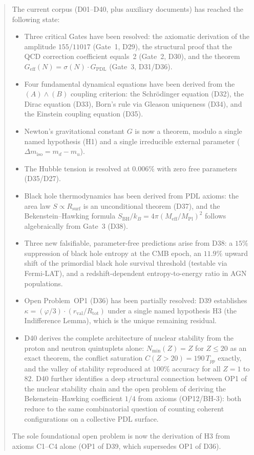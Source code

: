 \documentclass[11pt,a4paper]{article}
\theoremstyle{plain}
\theoremstyle{definition}
\theoremstyle{remark}
\newcommand{\Geff}{G_{\mathrm{eff}}}
\newcommand{\GPDL}{G_{\mathrm{PDL}}}
\newcommand{\rval}{r_{\mathrm{val}}}
\newcommand{\Rsurf}{R_{\mathrm{surf}}}
\newcommand{\Rtot}{R_{\mathrm{tot}}}
\newcommand{\sigmaN}{\sigma(N)}
\newcommand{\SBH}{S_{\mathrm{BH}}}
\newcommand{\Meff}{M_{\mathrm{eff}}}
\newcommand{\MPl}{M_{\mathrm{Pl}}}
\newcommand{\Tpp}{T_{pp}}
\newcommand{\Nmin}{N_{\min}}
\begin{document}
\begin{abstract}
The current corpus (D01--D40, plus auxiliary documents) has reached the following state:
\begin{itemize}
\item Three critical Gates have been resolved: the axiomatic derivation of the amplitude $155/11017$ (Gate~1, D29), the structural proof that the QCD correction coefficient equals~2 (Gate~2, D30), and the theorem $\Geff(N)=\sigmaN\cdot\GPDL$ (Gate~3, D31/D36).
\item Four fundamental dynamical equations have been derived from the $(A)\wedge(B)$ coupling criterion: the Schr\"odinger equation (D32), the Dirac equation (D33), Born's rule via Gleason uniqueness (D34), and the Einstein coupling equation (D35).
\item Newton's gravitational constant $G$ is now a theorem, modulo a single named hypothesis (H1) and a single irreducible external parameter ($\Delta m_{\mathrm{iso}} = m_d - m_u$).
\item The Hubble tension is resolved at $0.006\%$ with zero free parameters (D35/D27).
\item Black hole thermodynamics has been derived from PDL axioms: the area law $S \propto \Rsurf$ is an unconditional theorem (D37), and the Bekenstein--Hawking formula $\SBH/k_B = 4\pi(\Meff/\MPl)^2$ follows algebraically from Gate~3 (D38).
\item Three new falsifiable, parameter-free predictions arise from D38: a $15\%$ suppression of black hole entropy at the CMB epoch, an $11.9\%$ upward shift of the primordial black hole survival threshold (testable via Fermi-LAT), and a redshift-dependent entropy-to-energy ratio in AGN populations.
\item Open Problem~OP1 (D36) has been partially resolved: D39 establishes $\kappa = (\varphi/3)\cdot(\rval/\Rtot)$ under a single named hypothesis H3 (the Indifference Lemma), which is the unique remaining residual.
\item D40 derives the complete architecture of nuclear stability from the proton and neutron quintuplets alone: $\Nmin(Z) = Z$ for $Z \leq 20$ as an exact theorem, the conflict saturation $C(Z>20) = 190\,\Tpp$ exactly, and the valley of stability reproduced at $100\%$ accuracy for all $Z=1$ to $82$.
D40 further identifies a deep structural connection between OP1 of the nuclear stability chain and the open problem of deriving the Bekenstein--Hawking coefficient $1/4$ from axioms (OP12/BH-3): both reduce to the same combinatorial question of counting coherent configurations on a collective PDL surface.
\end{itemize}
The sole foundational open problem is now the derivation of H3 from axioms C1--C4 alone (OP1 of D39, which supersedes OP1 of D36).
\end{abstract}
\end{document}

